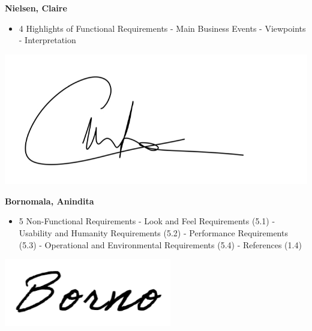 \documentclass[]{article}
\begin{document}
\textbf{Nielsen, Claire}
\begin{itemize}
        \item 4 Highlights of Functional Requirements
            \subitem - Main Business Events
            \subitem - Viewpoints
            \subitem - Interpretation
\end{itemize}
\includegraphics[scale=0.15]{clairesignature.jpg}

\textbf{Bornomala, Anindita}
\begin{itemize}
        \item 5 Non-Functional Requirements
            \subitem - Look and Feel Requirements (5.1)
            \subitem - Usability and Humanity Requirements (5.2)
            \subitem - Performance Requirements (5.3)
            \subitem - Operational and Environmental Requirements (5.4)
            \subitem - References (1.4)
\end{itemize}
\includegraphics[scale=0.50]{bornosignature.png}

\end{document}

